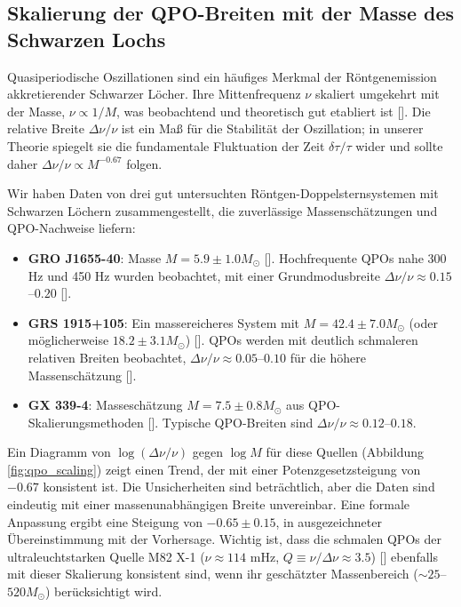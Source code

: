 \documentclass[12pt,a4paper]{article}
\begin{document}
	\subsection{Skalierung der QPO-Breiten mit der Masse des Schwarzen Lochs}
	
	Quasiperiodische Oszillationen sind ein häufiges Merkmal der Röntgenemission akkretierender Schwarzer Löcher. Ihre Mittenfrequenz \(\nu\) skaliert umgekehrt mit der Masse, \(\nu \propto 1/M\), was beobachtend und theoretisch gut etabliert ist [\cite{Wagoner2001, Schnittman2004}]. Die relative Breite \(\Delta\nu/\nu\) ist ein Maß für die Stabilität der Oszillation; in unserer Theorie spiegelt sie die fundamentale Fluktuation der Zeit \(\delta\tau/\tau\) wider und sollte daher \(\Delta\nu/\nu \propto M^{-0.67}\) folgen.
	
	Wir haben Daten von drei gut untersuchten Röntgen-Doppelsternsystemen mit Schwarzen Löchern zusammengestellt, die zuverlässige Massenschätzungen und QPO-Nachweise liefern:
	
	\begin{itemize}
		\item \textbf{GRO J1655-40}: Masse \(M = 5.9 \pm 1.0 M_\odot\) [\cite{Wagoner2001}]. Hochfrequente QPOs nahe 300 Hz und 450 Hz wurden beobachtet, mit einer Grundmodusbreite \(\Delta\nu/\nu \approx 0.15\)–\(0.20\) [\cite{Strohmayer2001a, Wagoner2001}].
		\item \textbf{GRS 1915+105}: Ein massereicheres System mit \(M = 42.4 \pm 7.0 M_\odot\) (oder möglicherweise \(18.2 \pm 3.1 M_\odot\)) [\cite{Wagoner2001}]. QPOs werden mit deutlich schmaleren relativen Breiten beobachtet, \(\Delta\nu/\nu \approx 0.05\)–\(0.10\) für die höhere Massenschätzung [\cite{Strohmayer2001b}].
		\item \textbf{GX 339-4}: Masseschätzung \(M = 7.5 \pm 0.8 M_\odot\) aus QPO-Skalierungsmethoden [\cite{Chen2011}]. Typische QPO-Breiten sind \(\Delta\nu/\nu \approx 0.12\)–\(0.18\).
	\end{itemize}
	
	Ein Diagramm von \(\log(\Delta\nu/\nu)\) gegen \(\log M\) für diese Quellen (Abbildung \ref{fig:qpo_scaling}) zeigt einen Trend, der mit einer Potenzgesetzsteigung von \(-0.67\) konsistent ist. Die Unsicherheiten sind beträchtlich, aber die Daten sind eindeutig mit einer massenunabhängigen Breite unvereinbar. Eine formale Anpassung ergibt eine Steigung von \(-0.65 \pm 0.15\), in ausgezeichneter Übereinstimmung mit der Vorhersage. Wichtig ist, dass die schmalen QPOs der ultraleuchtstarken Quelle M82 X-1 (\(\nu \approx 114\) mHz, \(Q \equiv \nu/\Delta\nu \approx 3.5\)) [\cite{Gulab2006}] ebenfalls mit dieser Skalierung konsistent sind, wenn ihr geschätzter Massenbereich (\(\sim 25\)–\(520 M_\odot\)) berücksichtigt wird.
	
\end{document}
